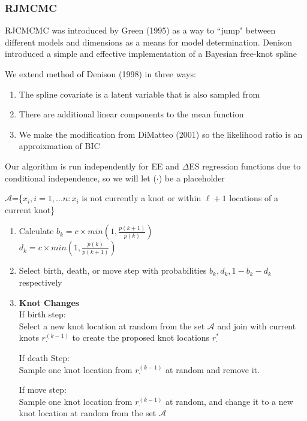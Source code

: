 \documentclass[handout]{beamer}\usepackage[]{graphicx}\usepackage[]{color}
\begin{document}
\begin{frame}
\frametitle{RJMCMC}
RJCMCMC was introduced by Green (1995) as a way to ``jump" between different models and dimensions as a means for model determination. Denison introduced a simple and effective implementation of a Bayesian free-knot spline

\vspace{0.3cm}

We extend method of Denison (1998) in three ways:
\begin{enumerate}
\item
The spline covariate is a latent variable that is also sampled from
\item
There are additional linear components to the mean function
\item
We make the modification from DiMatteo (2001) so the likelihood ratio is an approixmation of BIC
\end{enumerate}

\vspace{0.3cm}
Our algorithm is run independently for EE and $\Delta$ES regression functions due to conditional independence, so we will let ($\cdot$) be a placeholder

\end{frame}

\begin{frame}
$\mathcal{A}$=\{$x_i,i=1,...n:x_i$ is not currently a knot or within $\ell+1$ locations of a current knot\}


\begin{enumerate}
\item
Calculate $b_k = c \times min\left(1, \frac{p(k+1)}{p(k)} \right)$ \\
$d_k = c \times min\left(1, \frac{p(k)}{p(k+1)} \right)$ 

\item
Select birth, death, or move step with probabilities $b_k,d_k,1-b_k-d_k$ respectively \\

\item
{\bf Knot Changes} \\
If birth step:\\
Select a new knot location at random from the set $\mathcal{A}$ and join with current knots $r_{\cdot}^{(k-1)}$ to create the proposed knot locations $r_{\cdot}^{*}$

If death Step:\\
Sample one knot location from $r_{\cdot}^{(k-1)}$ at random and remove it. 

If move step:\\
Sample one knot location from $r_{\cdot}^{(k-1)}$ at random, and change it to a new knot location at random from the set $\mathcal{A}$

\end{enumerate}
\end{frame}
\end{document}
